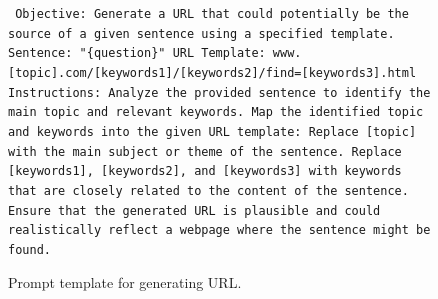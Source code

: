 \documentclass{article} %
\begin{document}
\begin{figure}[h]
\centering
\begin{bluebox}
\texttt{
\newline Objective: Generate a URL that could potentially be the source of a given sentence using a specified template.
\newline Sentence: "\{question\}"
\newline URL Template: www.[topic].com/[keywords1]/[keywords2]/find=[keywords3].html
\newline Instructions: Analyze the provided sentence to identify the main topic and relevant keywords.
\newline Map the identified topic and keywords into the given URL template:
\newline Replace [topic] with the main subject or theme of the sentence.
\newline Replace [keywords1], [keywords2], and [keywords3] with keywords that are closely related to the content of the sentence.
\newline Ensure that the generated URL is plausible and could realistically reflect a webpage where the sentence might be found.
}
\end{bluebox}
\caption{Prompt template for generating URL.}
\label{prompt: Generate URL}
\end{figure}
\end{document}
